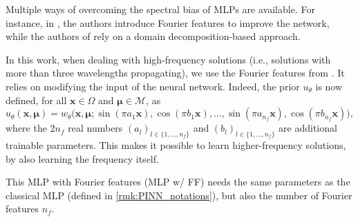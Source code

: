 Multiple ways of overcoming the spectral bias of MLPs are available.
For instance, in \cite{TanSri2020}, the authors introduce Fourier features to improve the network, while the authors of \cite{DolHeiMisMos2024} rely on a domain decomposition-based approach.

In this work, when dealing with high-frequency solutions (i.e., solutions with more than three wavelengths propagating), we use the Fourier features from \cite{TanSri2020}.
It relies on modifying the input of the neural network.
Indeed, the prior $u_\theta$ is now defined, for all $\bm{x} \in \Omega$ and $\bm{\mu} \in \mathcal{M}$, as
\begin{equation*}
    u_\theta(\bm{x},\bm{\mu}) =
    w_\theta\big(
        \bm{x},\bm{\mu};
        \sin(\pi a_1 \bm{x}),
        \cos(\pi b_1 \bm{x}),
        \dots,
        \sin(\pi a_{n_f} \bm{x}),
        \cos(\pi b_{n_f} \bm{x})
    \big),
\end{equation*}
where the $2 n_f$ real numbers $(a_l)_{l \in \{1, \dots, n_f\}}$ and $(b_l)_{l \in \{1, \dots, n_f\}}$ are additional trainable parameters.
This makes it possible to learn higher-frequency solutions, by also learning the frequency itself.

\begin{remark}\label{rmk:PINN_notations_Fourier}
	This MLP with Fourier features (MLP w/ FF) needs the same parameters as the classical MLP (defined in \cref{rmk:PINN_notations}), but also the number of Fourier features $n_f$.
\end{remark}
